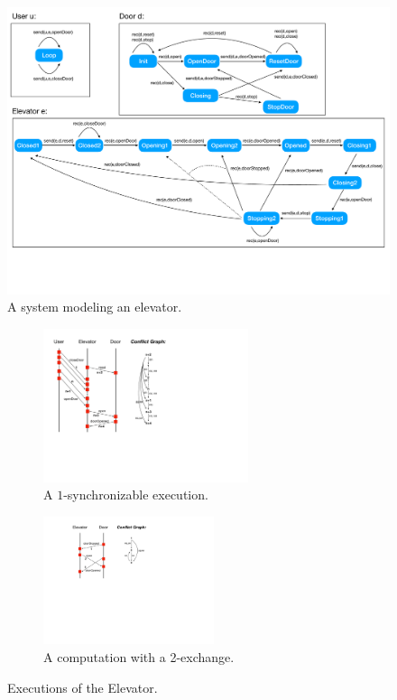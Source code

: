 \begin{figure}[t]
\includegraphics[width=12cm]{elevator.pdf}
\vspace{-3mm}
\caption{A system modeling an elevator.}
\label{fig:elevator}
\vspace{-5mm}
\end{figure}

\begin{figure}[t]
\begin{subfigure}[t]{5.2cm}
\includegraphics[width=6cm]{MSC-elevator1.pdf}
\vspace{-3mm}
\caption{A $1$-synchronizable execution.}
\label{fig:elevator-exec1}
\end{subfigure}
\hspace{1cm}
\begin{subfigure}[t]{5.5cm}
\includegraphics[width=5cm]{MSC-elevator2.pdf}
\vspace{-3mm}
\caption{A computation with a 2-exchange.}
\label{fig:elevator-exec2}
\end{subfigure}
\vspace{-2mm}
\caption{Executions of the Elevator.}
\label{fig:elevator-exec}
\vspace{-6mm}
\end{figure}

